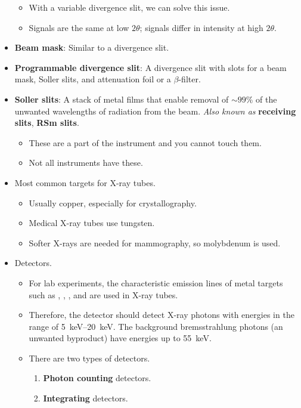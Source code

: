 \documentclass[../notes.tex]{subfiles}
\begin{document}
\begin{itemize}
\begin{itemize}
        \item With a variable divergence slit, we can solve this issue.
        \item Signals are the same at low $2\theta$; signals differ in intensity at high $2\theta$.
    \end{itemize}
    \item \textbf{Beam mask}: Similar to a divergence slit.
    \item \textbf{Programmable divergence slit}: A divergence slit with slots for a beam mask, Soller slits, and attenuation foil or a $\beta$-filter.
    \item \textbf{Soller slits}: A stack of metal films that enable removal of $\sim 99\%$ of the unwanted wavelengths of radiation from the beam. \emph{Also known as} \textbf{receiving slits}, \textbf{RSm slits}.
    \begin{itemize}
        \item These are a part of the instrument and you cannot touch them.
        \item Not all instruments have these.
    \end{itemize}
    \item Most common targets for X-ray tubes.
    \begin{itemize}
        \item Usually copper, especially for crystallography.
        \item Medical X-ray tubes use tungsten.
        \item Softer X-rays are needed for mammography, so molybdenum is used.
    \end{itemize}
    \item Detectors.
    \begin{itemize}
        \item For lab experiments, the characteristic emission lines of metal targets such as , , , and  are used in X-ray tubes.
        \item Therefore, the detector should detect X-ray photons with energies in the range of \SIrange{5}{20}{\kilo\electronvolt}. The background bremsstrahlung photons (an unwanted byproduct) have energies up to \SI{55}{\kilo\electronvolt}.
        \item There are two types of detectors.
        \begin{enumerate}[label={(\roman*)}]
            \item \textbf{Photon counting} detectors.
            \item \textbf{Integrating} detectors.

\end{enumerate}
\end{itemize}
\end{itemize}
\end{document}
